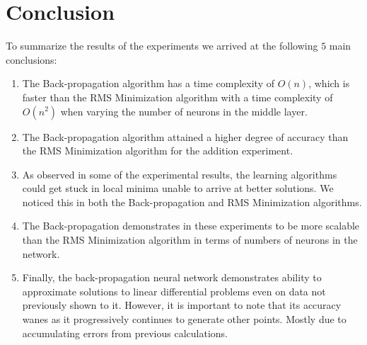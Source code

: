 \documentclass[11pt]{article}
\begin{document}


\section{Conclusion} %
\label{sec:conclusion}

To summarize the results of the experiments we arrived at the following $5$ main conclusions:

\begin{enumerate}

\item The Back-propagation algorithm has a time complexity of $O(n)$, which is faster than the RMS Minimization algorithm with a time
complexity of $O(n^{2})$ when varying the number of neurons in the middle layer.

\item The Back-propagation algorithm attained a higher degree of accuracy than the RMS Minimization algorithm for the addition
experiment.

\item As observed in some of the experimental results, the learning algorithms could get stuck in local minima unable to arrive at
better solutions. We noticed this in both the Back-propagation and RMS Minimization algorithms.

\item The Back-propagation demonstrates in these experiments to be more scalable than the RMS Minimization algorithm in terms of numbers
of neurons in the network.

\item Finally, the back-propagation neural network demonstrates ability to approximate solutions to linear differential problems even on
data not previously shown to it. However, it is important to note that its accuracy wanes as it progressively continues to generate
other points. Mostly due to accumulating errors from previous calculations.

\end{enumerate}



\end{document}
